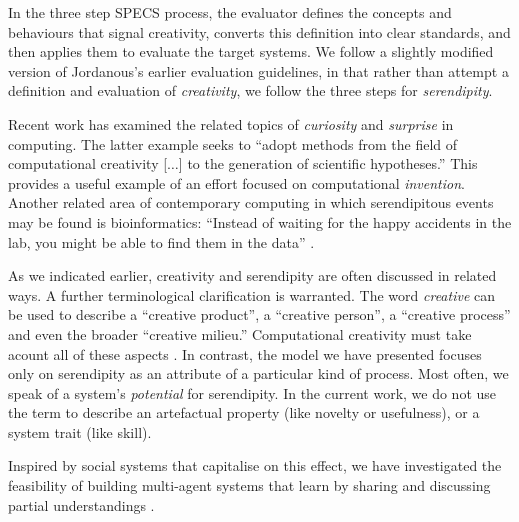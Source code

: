 In the three step SPECS process, the evaluator defines the concepts
and behaviours that signal creativity, converts this definition into
clear standards, and then applies them to evaluate the target systems.
%
We follow a slightly modified version of Jordanous's earlier evaluation
guidelines, in that rather than attempt a definition and evaluation of
{\em creativity}, we follow the three steps for \emph{serendipity}.





Recent work has examined the related topics of \emph{curiosity}
\cite{wu2013curiosity} and \emph{surprise} \cite{grace2014using} in
computing.  The latter example seeks to ``adopt methods from the field
of computational creativity [$\ldots$] to the generation of scientific
hypotheses.''  This provides a useful example of an effort focused on
computational \emph{invention}.  Another related area of contemporary
computing in which serendipitous events may be found is
bioinformatics: ``Instead of waiting for the happy accidents in the
lab, you might be able to find them in the data''
\cite[p.~70]{kennedy2016inventology}.

As we indicated earlier, creativity and serendipity are often
discussed in related ways.  A further terminological clarification is
warranted.  The word \emph{creative} can be used to describe a
``creative product'', a ``creative person'', a ``creative process''
and even the broader ``creative milieu.''  Computational creativity
must take acount all of these aspects \cite{jordanous2016four}.  In
contrast, the model we have presented focuses only on serendipity as
an attribute of a particular kind of process.  Most often, we speak of
a system's \emph{potential} for serendipity.  In the current work, we
do not use the term to describe an artefactual property (like novelty
or usefulness), or a system trait (like skill).

Inspired by social systems that capitalise on this effect, we have investigated the feasibility
of building multi-agent systems that learn by sharing and discussing
partial understandings \cite{corneli2015computational,corneli2015feedback}.


